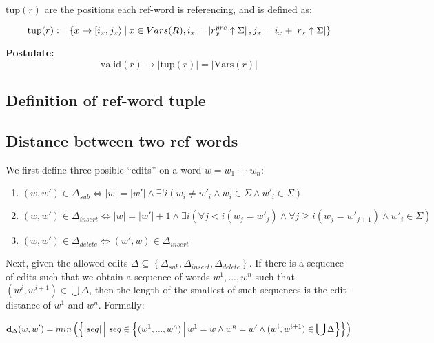 \documentclass{article}
\newcommand{\abs}[1]{\left|#1\right|}
\newcommand{\set}[1]{\left\{#1\right\}}
\newcommand{\paren}[1]{\left(#1\right)}
\newcommand{\st}{\ \vline \ }
\begin{document}
$\mathrm{tup}(r)$ are the positions each ref-word is referencing,
and is defined as:

\begin{equation}
    \mathrm{tup}(r) := \set{x \mapsto [i_x, j_x\rangle \st x \in
    Vars(R), i_x = \abs{r_x^{pre} \uparrow \Sigma}, j_x = i_x +
    \abs{r_x \uparrow \Sigma}}
\end{equation}

\textbf{Postulate:} 
\begin{equation}
    \mathrm{valid}(r) \rightarrow \abs{\mathrm{tup}(r)} = \abs{\mathrm{Vars}(r)}
\end{equation}
\subsection*{Definition of ref-word tuple}

\subsection*{Distance between two ref words}

We first define three posible ``edits'' on a word $w = w_1 \cdot\cdot\cdot w_n$:

\begin{enumerate}
    \item $(w, w') \in \Delta_{sub} \iff |w| = |w'| \land \exists! i (w_i \not= w'_i \land w_i \in \Sigma \land w'_i \in \Sigma)$
    \item $(w, w') \in \Delta_{insert} \iff |w| = |w'| + 1 \land \exists i (\forall j < i(w_j = w'_j) \land \forall j \geq i (w_j = w'_{j+1}) \land w'_i \in \Sigma)$
    \item $(w, w') \in \Delta_{delete} \iff (w', w) \in \Delta_{insert}$
\end{enumerate}

Next, given the allowed edits $\Delta \subseteq \set{\Delta_{sub}, \Delta_{insert}, \Delta_{delete}}$. If there is a sequence of edits such that we obtain a sequence of words $w^1 , ..., w^n$ such that $(w^i, w^{i+1}) \in \bigcup \Delta$, then the length of the smallest of such sequences is the edit-distance of $w^1$ and $w^n$. Formally: 

\begin{equation}
    \mathbf{d}_\Delta(w, w') = min\paren{\set{ 
        \abs{seq} \st seq \in \set{
            (w^1,...,w^n) \st w^1 = w \land w^n = w' \land (w^i, w^{i+1}) \in \bigcup \Delta
        }
    }}
\end{equation}
\end{document}
